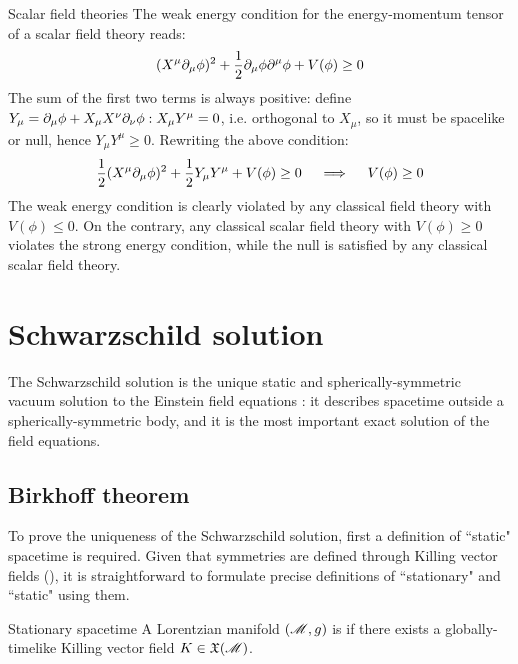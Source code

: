 \begin{example}{Scalar field theories}{}
  The weak energy condition for the energy-momentum tensor of a scalar field theory  reads:
  \begin{equation*}
    (X^\mu \partial_\mu \phi)^2 + \frac{1}{2} \partial_\mu \phi \partial^\mu \phi + V(\phi) \ge 0
  \end{equation*}
  The sum of the first two terms is always positive: define $ Y_\mu = \partial_\mu \phi + X_\mu X^\nu \partial_\nu \phi : X_\mu Y^\mu = 0 $, i.e. orthogonal to $ X_\mu $, so it must be spacelike or null, hence $ Y_\mu Y^\mu \ge 0 $. Rewriting the above condition:
  \begin{equation*}
    \frac{1}{2} (X^\mu \partial_\mu \phi)^2 + \frac{1}{2} Y_\mu Y^\mu + V(\phi) \ge 0
    \quad \implies \quad
    V(\phi) \ge 0
  \end{equation*}
  The weak energy condition is clearly violated by any classical field theory with $ V(\phi) \le 0 $. On the contrary, any classical scalar field theory with $ V(\phi) \ge 0 $ violates the strong energy condition, while the null is satisfied by any classical scalar field theory.
\end{example}

\section{Schwarzschild solution}
\label{sec:schwarz-sol}


The Schwarzschild solution is the unique static and spherically-symmetric vacuum solution to the Einstein field equations : it describes spacetime outside a spherically-symmetric body, and it is the most important exact solution of the field equations.

\subsection{Birkhoff theorem}

To prove the uniqueness of the Schwarzschild solution, first a definition of ``static" spacetime is required. Given that symmetries are defined through Killing vector fields (), it is straightforward to formulate precise definitions of ``stationary" and ``static" using them.

\begin{definition}{Stationary spacetime}{}
  A Lorentzian manifold $ (\mathscr{M} , g) $ is  if there exists a globally-timelike Killing vector field $ K \in \mathfrak{X}(\mathscr{M}) $.
\end{definition}

